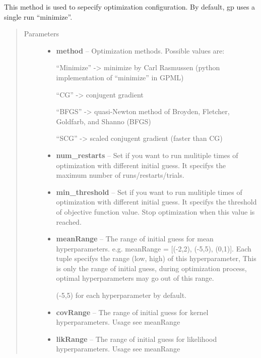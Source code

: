 \documentclass[letterpaper,10pt,english]{sphinxmanual}
\begin{document}
\begin{fulllineitems}
\label{Opts:pyGPs.Core.gp.GP.setOptimizer}
This method is used to sepecify optimization configuration. By default, gp uses a single run ``minimize''.
\begin{quote}\begin{description}
\item[{Parameters}] \leavevmode\begin{itemize}
\item {} 
\textbf{method} -- 
Optimization methods. Possible values are:

``Minimize''   -\textgreater{} minimize by Carl Rasmussen (python implementation of ``minimize'' in GPML)

``CG''         -\textgreater{} conjugent gradient

``BFGS''       -\textgreater{} quasi-Newton method of Broyden, Fletcher, Goldfarb, and Shanno (BFGS)

``SCG''        -\textgreater{} scaled conjugent gradient (faster than CG)


\item {} 
\textbf{num\_restarts} -- Set if you want to run mulitiple times of optimization with different initial guess. 
It specifys the maximum number of runs/restarts/trials.

\item {} 
\textbf{min\_threshold} -- Set if you want to run mulitiple times of optimization with different initial guess. 
It specifys the threshold of objective function value. Stop optimization when this value is reached.

\item {} 
\textbf{meanRange} -- 
The range of initial guess for mean hyperparameters. 
e.g. meanRange = {[}(-2,2), (-5,5), (0,1){]}.
Each tuple specifys the range (low, high) of this hyperparameter,
This is only the range of initial guess, during optimization process, optimal hyperparameters may go out of this range.

(-5,5) for each hyperparameter by default.


\item {} 
\textbf{covRange} -- The range of initial guess for kernel hyperparameters. Usage see meanRange

\item {} 
\textbf{likRange} -- The range of initial guess for likelihood hyperparameters. Usage see meanRange

\end{itemize}

\end{description}\end{quote}

\end{fulllineitems}
\end{document}
